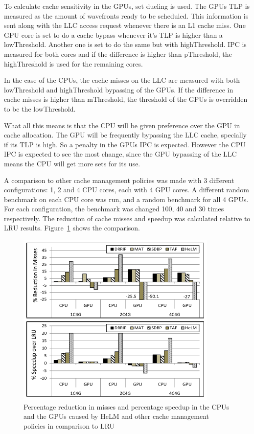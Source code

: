 \documentclass[12pt,journal,compsoc]{IEEEtran}
\begin{document}
To calculate cache sensitivity in the GPUs, set dueling is used. The GPUs TLP is measured as the amount of wavefronts ready to be scheduled. This information is sent along with the LLC access request whenever there is an L1 cache miss. One GPU core is set to do a cache bypass whenever it's TLP is higher than a lowThreshold. Another one is set to do the same but with highThreshold. IPC is measured for both cores and if the difference is higher than pThreshold, the highThreshold is used for the remaining cores.

In the case of the CPUs, the cache misses on the LLC are measured with both lowThreshold and highThreshold bypassing of the GPUs. If the difference in cache misses is higher than mThreshold, the threshold of the GPUs is overridden to be the lowThreshold.

What all this means is that the CPU will be given preference over the GPU in cache allocation. The GPU will be frequently bypassing the LLC cache, specially if its TLP is high. So a penalty in the GPUs IPC is expected. However the CPU IPC is expected to see the most change, since the GPU bypassing of the LLC means the CPU will get more sets for its use.

A comparison to other cache management policies was made with 3 different configurations: 1, 2 and 4 CPU cores, each with 4 GPU cores. A different random benchmark on each CPU core was run, and a random benchmark for all 4 GPUs. For each configuration, the benchmark was changed 100, 40 and 30 times respectively. The reduction of cache misses and speedup was calculated relative to LRU results. Figure~\ref{fig:comp} shows the comparison.

\begin{figure}[H]
	\centering
	\includegraphics[width = 8 cm]{graphics/LLCresults.png}
	\caption{Percentage reduction in misses and percentage speedup in the CPUs and the GPUs caused by HeLM and other cache management policies in comparison to LRU}\label{fig:comp}
\end{figure} 
\end{document}
